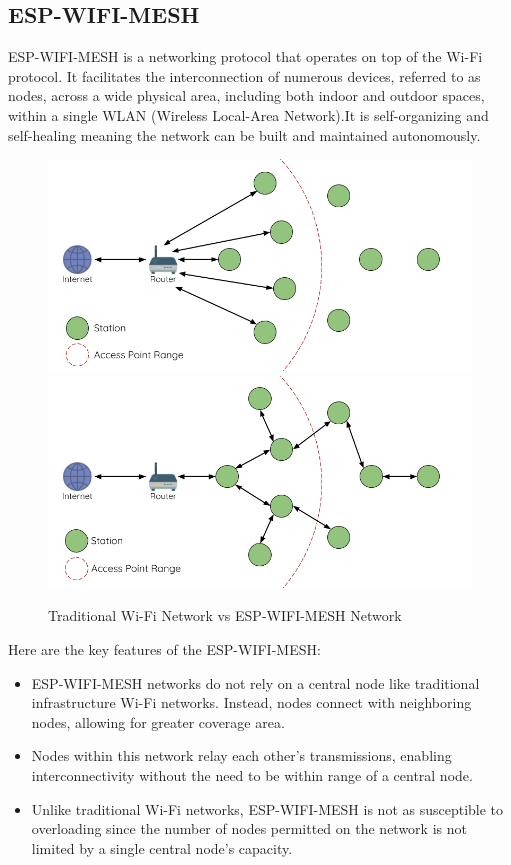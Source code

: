 \subsection{ESP-WIFI-MESH}
ESP-WIFI-MESH is a networking protocol that operates on top of the Wi-Fi protocol. It facilitates the interconnection of numerous devices, referred to as nodes, across a wide physical area, including both indoor and outdoor spaces, within a single WLAN (Wireless Local-Area Network).It is self-organizing and self-healing meaning the network can be built and maintained autonomously.

\begin{figure}[H]
     \includegraphics[width=0.5\linewidth]{Files/Images/traditional-network.png}
     \includegraphics[width=0.55\linewidth]{Files/Images/esp-wifi-mesh.png}
     \caption{Traditional Wi-Fi Network vs ESP-WIFI-MESH Network}
     \label{fig:enter-label}

\end{figure}

Here are the key features of the ESP-WIFI-MESH:
\begin{itemize}
    \item ESP-WIFI-MESH networks do not rely on a central node like traditional infrastructure Wi-Fi networks. Instead, nodes connect with neighboring nodes, allowing for greater coverage area.
    \item Nodes within this network relay each other's transmissions, enabling interconnectivity without the need to be within range of a central node.
    \item Unlike traditional Wi-Fi networks, ESP-WIFI-MESH is not as susceptible to overloading since the number of nodes permitted on the network is not limited by a single central node's capacity.
\end{itemize}

